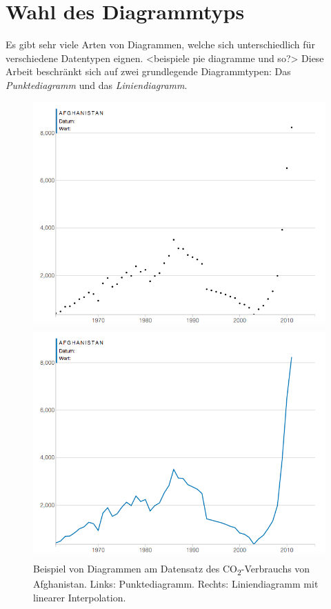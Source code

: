 \section{Wahl des Diagrammtyps}

Es gibt sehr viele Arten von Diagrammen, welche sich unterschiedlich für verschiedene Datentypen eignen. <beispiele pie diagramme und so?> Diese Arbeit beschränkt sich auf zwei grundlegende Diagrammtypen: Das \textit{Punktediagramm} und das \textit{Liniendiagramm}.

\begin{figure}[!htbp]
	\centering
	\begin{minipage}{0.45\textwidth}
		\centering
		\includegraphics[width=\linewidth]{images/scatterplot_no_interpolation}
	\end{minipage}\hfill
	\begin{minipage}{0.45\textwidth}
		\centering
		\includegraphics[width=\linewidth]{images/scatterplot_interpolated}
	\end{minipage}
	\caption[Vergleich zwischen Punktediagramm und Liniendiagramm]{Beispiel von Diagrammen am Datensatz des CO\textsubscript{2}-Verbrauchs von Afghanistan. Links: Punktediagramm. Rechts: Liniendiagramm mit linearer Interpolation.}
	\label{fig:scatterplot}
\end{figure}

